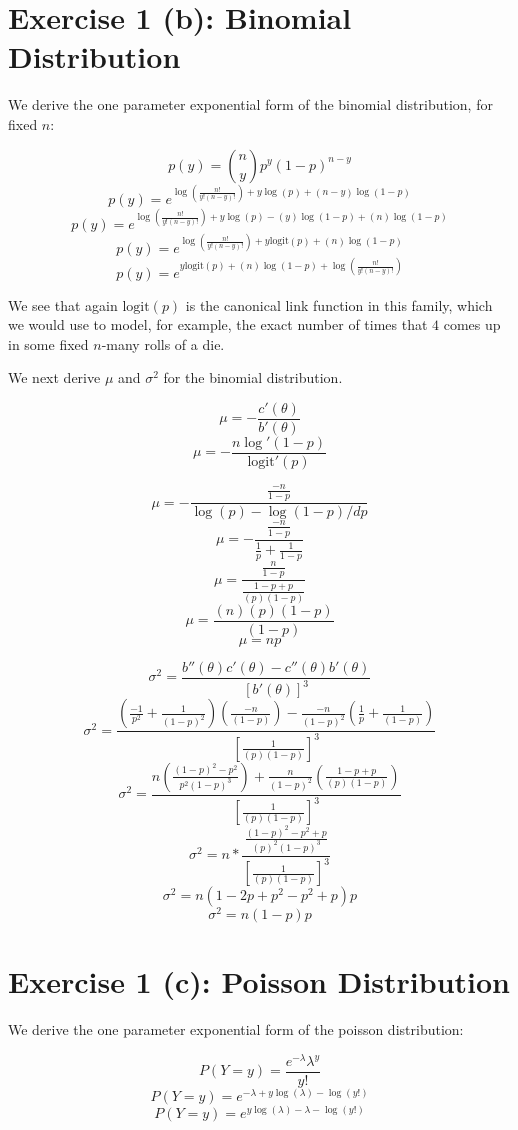 \documentclass[12pt,a4paper]{article}
\begin{document}
\section{Exercise 1 (b): Binomial Distribution}

We derive the one parameter exponential form of the binomial distribution, for fixed $n$: 

$$p(y) = {n \choose y} p^{y} (1-p)^{n-y} $$
$$p(y) = e^{\log(\frac{n!}{y! (n-y)!}) + y \log(p) + (n-y)\log(1-p)} $$
$$p(y) = e^{\log(\frac{n!}{y! (n-y)!}) + y \log(p) - (y)\log(1-p)+ (n)\log(1-p)} $$
$$p(y) = e^{\log(\frac{n!}{y! (n-y)!}) + y \text{logit}(p) + (n)\log(1-p)} $$
$$p(y) = e^{y \text{logit}(p) + (n)\log(1-p) + \log(\frac{n!}{y! (n-y)!}) } $$

We see that again $\text{logit}(p)$ is the canonical link function in this family, which we would use to model, for example, the exact number of times that $4$ comes up in some fixed $n$-many rolls of a die.

\newpage

We next derive $\mu$ and $\sigma^{2}$ for the binomial distribution.

$$\mu = - \frac{c'(\theta)}{b'(\theta)}$$
$$\mu = - \frac{n\log'(1-p)}{\text{logit}'(p)}$$

$$\mu = - \frac{\frac{-n}{1-p}}{\log(p) - \log(1-p) /dp}$$
$$\mu = - \frac{\frac{-n}{1-p}}{\frac{1}{p} + \frac{1}{1-p} }$$
$$\mu =  \frac{\frac{n}{1-p}}{\frac{1 - p + p}{(p)(1-p)}}$$
$$\mu =  \frac{(n)(p)(1-p)}{(1-p)}$$
$$\mu =  np$$

$$\sigma^{2} = \frac{b''(\theta)c'(\theta) - c''(\theta)b'(\theta)}{[b'(\theta)]^{3}}$$
$$\sigma^{2} = \frac{(\frac{-1}{p^2} + \frac{1}{(1-p)^2})(\frac{-n}{(1-p)}) - \frac{-n}{(1-p)^2}(\frac{1}{p} + \frac{1}{(1-p)})}{[\frac{1}{(p)(1-p)}]^{3}}$$
$$\sigma^{2} = \frac{n(\frac{(1-p)^{2} - p^{2}}{p^2(1-p)^{3}}) + \frac{n}{(1-p)^2}(\frac{1-p+p}{(p)(1-p)})}{[\frac{1}{(p)(1-p)}]^{3}}$$
$$\sigma^{2} = n*\frac{\frac{(1-p)^2-p^2+p}{(p)^2(1-p)^3}}{[\frac{1}{(p)(1-p)}]^{3}}$$
$$\sigma^{2} = n(1-2p+p^2-p^2+p)p$$
$$\sigma^{2} = n(1-p)p$$


\newpage
\section{Exercise 1 (c): Poisson Distribution}

We derive the one parameter exponential form of the poisson distribution: 

$$P(Y=y) = \frac{e^{-\lambda}\lambda^{y}}{y!} $$
$$P(Y=y) = e^{-\lambda + y\log(\lambda) - \log(y!)} $$
$$P(Y=y) = e^{y\log(\lambda) - \lambda - \log(y!)} $$
\end{document}
